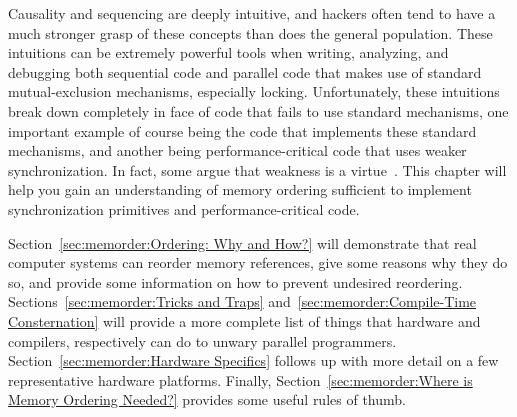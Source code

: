 
%

Causality and sequencing are deeply intuitive, and hackers often
tend to have a much stronger grasp of these concepts than does
the general population.
These intuitions can be extremely powerful tools when writing, analyzing,
and debugging both sequential code and parallel code that makes
use of standard mutual-exclusion mechanisms, especially locking.
Unfortunately, these intuitions break down completely in face of
code that fails to use standard mechanisms, one important example
of course being the code that implements these standard mechanisms,
and another being performance-critical code that uses weaker
synchronization.
In fact, some argue that weakness is a
virtue~\cite{JadeAlglave2013-WeaknessIsVirtue}.
This chapter will help you gain an understanding of memory ordering
sufficient to implement synchronization primitives and
performance-critical code.

Section~\ref{sec:memorder:Ordering: Why and How?}
will demonstrate that real computer systems can reorder memory references,
give some reasons why they do so, and provide some information on how
to prevent undesired reordering.
Sections~\ref{sec:memorder:Tricks and Traps}
and~\ref{sec:memorder:Compile-Time Consternation}
will provide a more complete list of things that hardware and compilers,
respectively can do to unwary parallel programmers.
Section~\ref{sec:memorder:Hardware Specifics}
follows up with more detail on a few representative hardware platforms.
Finally, Section~\ref{sec:memorder:Where is Memory Ordering Needed?}
provides some useful rules of thumb.

